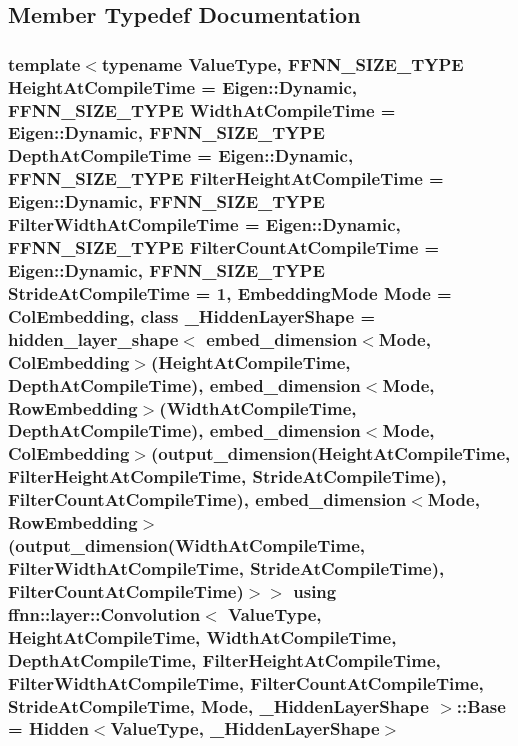 \subsection{Member Typedef Documentation}
\hypertarget{classffnn_1_1layer_1_1_convolution_a6ad431ef10ff2e20cc1500b5765efe94}{
\subsubsection[{Base}]{\setlength{\rightskip}{0pt plus 5cm}template$<$typename Value\-Type, F\-F\-N\-N\-\_\-\-S\-I\-Z\-E\-\_\-\-T\-Y\-P\-E Height\-At\-Compile\-Time = Eigen\-::\-Dynamic, F\-F\-N\-N\-\_\-\-S\-I\-Z\-E\-\_\-\-T\-Y\-P\-E Width\-At\-Compile\-Time = Eigen\-::\-Dynamic, F\-F\-N\-N\-\_\-\-S\-I\-Z\-E\-\_\-\-T\-Y\-P\-E Depth\-At\-Compile\-Time = Eigen\-::\-Dynamic, F\-F\-N\-N\-\_\-\-S\-I\-Z\-E\-\_\-\-T\-Y\-P\-E Filter\-Height\-At\-Compile\-Time = Eigen\-::\-Dynamic, F\-F\-N\-N\-\_\-\-S\-I\-Z\-E\-\_\-\-T\-Y\-P\-E Filter\-Width\-At\-Compile\-Time = Eigen\-::\-Dynamic, F\-F\-N\-N\-\_\-\-S\-I\-Z\-E\-\_\-\-T\-Y\-P\-E Filter\-Count\-At\-Compile\-Time = Eigen\-::\-Dynamic, F\-F\-N\-N\-\_\-\-S\-I\-Z\-E\-\_\-\-T\-Y\-P\-E Stride\-At\-Compile\-Time = 1, Embedding\-Mode Mode = Col\-Embedding, class \-\_\-\-Hidden\-Layer\-Shape = hidden\-\_\-layer\-\_\-shape$<$              embed\-\_\-dimension$<$\-Mode, Col\-Embedding$>$(\-Height\-At\-Compile\-Time, Depth\-At\-Compile\-Time),              embed\-\_\-dimension$<$\-Mode, Row\-Embedding$>$(\-Width\-At\-Compile\-Time,  Depth\-At\-Compile\-Time),              embed\-\_\-dimension$<$\-Mode, Col\-Embedding$>$(output\-\_\-dimension(\-Height\-At\-Compile\-Time, Filter\-Height\-At\-Compile\-Time, Stride\-At\-Compile\-Time), Filter\-Count\-At\-Compile\-Time),              embed\-\_\-dimension$<$\-Mode, Row\-Embedding$>$(output\-\_\-dimension(\-Width\-At\-Compile\-Time,  Filter\-Width\-At\-Compile\-Time,  Stride\-At\-Compile\-Time), Filter\-Count\-At\-Compile\-Time)$>$$>$ using {\bf ffnn\-::layer\-::\-Convolution}$<$ Value\-Type, Height\-At\-Compile\-Time, Width\-At\-Compile\-Time, Depth\-At\-Compile\-Time, Filter\-Height\-At\-Compile\-Time, Filter\-Width\-At\-Compile\-Time, Filter\-Count\-At\-Compile\-Time, Stride\-At\-Compile\-Time, Mode, \-\_\-\-Hidden\-Layer\-Shape $>$\-::{\bf Base} =  {\bf Hidden}$<$Value\-Type, \-\_\-\-Hidden\-Layer\-Shape$>$}}\label{classffnn_1_1layer_1_1_convolution_a6ad431ef10ff2e20cc1500b5765efe94}


